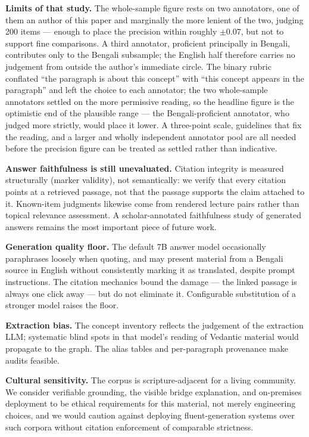 \documentclass[pdflatex,sn-mathphys-num]{sn-jnl}
\begin{document}
\textbf{Limits of that study.} The whole-sample figure rests on two
annotators, one of them an author of this paper and marginally the more
lenient of the two, judging 200 items --- enough to place the precision
within roughly $\pm 0.07$, but not to support fine comparisons. A third
annotator, proficient principally in Bengali, contributes only to the
Bengali subsample; the English half therefore carries no judgement from
outside the author's immediate circle. The binary rubric conflated ``the
paragraph is about this concept'' with ``this concept appears in the
paragraph'' and left the choice to each annotator; the two whole-sample
annotators settled on the more permissive reading, so the headline figure
is the optimistic end of the plausible range --- the Bengali-proficient
annotator, who judged more strictly, would place it lower. A three-point
scale, guidelines that fix the reading, and a larger and wholly
independent annotator pool are all needed before the precision figure can
be treated as settled rather than indicative.

\textbf{Answer faithfulness is still unevaluated.} Citation integrity is
measured structurally (marker validity), not semantically: we verify that
every citation points at a retrieved passage, not that the passage
supports the claim attached to it. Known-item judgments likewise come
from rendered lecture pairs rather than topical relevance assessment. A
scholar-annotated faithfulness study of generated answers remains the
most important piece of future work.

\textbf{Generation quality floor.} The default 7B answer model
occasionally paraphrases loosely when quoting, and may present material
from a Bengali source in English without consistently marking it as
translated, despite prompt instructions. The citation mechanics bound
the damage --- the linked passage is always one click away --- but do not
eliminate it. Configurable substitution of a stronger model raises the
floor.

\textbf{Extraction bias.} The concept inventory reflects the judgement
of the extraction LLM; systematic blind spots in that model's reading of
Vedantic material would propagate to the graph. The alias tables and
per-paragraph provenance make audits feasible.

\textbf{Cultural sensitivity.} The corpus is scripture-adjacent for a
living community. We consider verifiable grounding, the visible bridge
explanation, and on-premises deployment to be ethical requirements for
this material, not merely engineering choices, and we would caution
against deploying fluent-generation systems over such corpora without
citation enforcement of comparable strictness.
\end{document}

